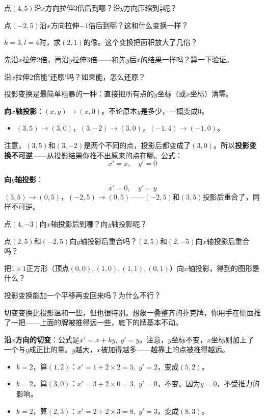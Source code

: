 \documentclass[a4paper,12pt]{ctexart}
\begin{document}
\begin{exercise}[伸缩练习]
\item 点$(4,5)$沿$x$方向拉伸$3$倍后到哪？沿$y$方向压缩到$\frac12$呢？
\item 点$(-2,5)$沿$x$方向拉伸$-1$倍后到哪？这和什么变换一样？
\item $k=3,l=4$时，求$(2,1)$的像。这个变换把面积放大了几倍？
\item 先沿$x$拉伸$2$倍，再沿$y$拉伸$3$倍——和先$y$后$x$的结果一样吗？算一下验证。
\item 沿$x$拉伸$2$倍能"还原"吗？如果能，怎么还原？
\end{exercise}



投影变换是最简单粗暴的一种：直接把所有点的$y$坐标（或$x$坐标）清零。

\textbf{向$x$轴投影}：$(x,y)\to(x,0)$。不论原本$y$是多少，一概变成$0$。
\begin{itemize}
\item $(3,5)\to(3,0)$，$(3,-2)\to(3,0)$，$(-1,4)\to(-1,0)$。
\end{itemize}
注意，$(3,5)$和$(3,-2)$是两个不同的点，投影后都变成了$(3,0)$。所以\textbf{投影变换不可逆}——从投影结果你推不出原来的点在哪。公式：
\[
x'=x,\quad y'=0
\]

\textbf{向$y$轴投影}：
\[
x'=0,\quad y'=y
\]
$(3,5)\to(0,5)$，$(-2,5)\to(0,5)$——$(-2,5)$和$(3,5)$投影后重合了，同样不可逆。

\begin{exercise}[投影练习]
\item 点$(4,-3)$向$x$轴投影后到哪？向$y$轴投影呢？
\item 点$(2,5)$和$(-2,5)$向$y$轴投影后重合吗？$(2,5)$和$(2,-5)$向$x$轴投影后重合吗？
\item 把$1\times1$正方形（顶点$(0,0),(1,0),(1,1),(0,1)$）向$x$轴投影，得到的图形是什么？
\item 投影变换能加一个平移再变回来吗？为什么不行？
\end{exercise}



切变变换比投影温和一些，但也很特别。想象一叠整齐的扑克牌，你用手在侧面推了一把——上面的牌被推得远一些，底下的牌基本不动。

\textbf{沿$x$方向的切变}：公式是$x'=x+ky,\;y'=y$。注意，$y$坐标不变，$x$坐标则加上了一个与$y$成正比的量。$y$越大，$x$被加得越多——越靠上的点被推得越远。
\begin{itemize}
\item $k=2$，算$(1,2)$：$x'=1+2\times2=5,\;y'=2$，变成$(5,2)$。
\item $k=2$，算$(3,0)$：$x'=3+2\times0=3,\;y'=0$，不变。因为$y=0$，不受推力的影响。
\item $k=2$，算$(2,3)$：$x'=2+2\times3=8,\;y'=3$，变成$(8,3)$。
\end{itemize}
\end{document}
